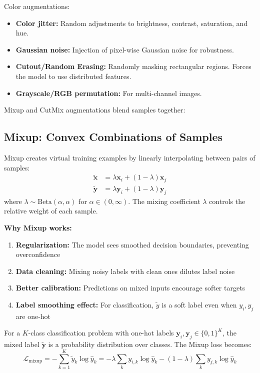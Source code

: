 Color augmentations:
\begin{itemize}
    \item \textbf{Color jitter:} Random adjustments to brightness, contrast, saturation, and hue.
    \item \textbf{Gaussian noise:} Injection of pixel-wise Gaussian noise for robustness.
    \item \textbf{Cutout/Random Erasing:} Randomly masking rectangular regions. Forces the model to use distributed features.
    \item \textbf{Grayscale/RGB permutation:} For multi-channel images.
\end{itemize}

Mixup and CutMix augmentations blend samples together:

\subsection{Mixup: Convex Combinations of Samples}

Mixup \cite{zhang2018mixup} creates virtual training examples by linearly interpolating between pairs of samples:
\begin{align}
\tilde{\mathbf{x}} &= \lambda \mathbf{x}_i + (1 - \lambda)\mathbf{x}_j \\
\tilde{\mathbf{y}} &= \lambda \mathbf{y}_i + (1 - \lambda)\mathbf{y}_j
\end{align}
where $\lambda \sim \text{Beta}(\alpha, \alpha)$ for $\alpha \in (0, \infty)$. The mixing coefficient $\lambda$ controls the relative weight of each sample.

\textbf{Why Mixup works:}
\begin{enumerate}
    \item \textbf{Regularization:} The model sees smoothed decision boundaries, preventing overconfidence
    \item \textbf{Data cleaning:} Mixing noisy labels with clean ones dilutes label noise
    \item \textbf{Better calibration:} Predictions on mixed inputs encourage softer targets
    \item \textbf{Label smoothing effect:} For classification, $\tilde{y}$ is a soft label even when $y_i, y_j$ are one-hot
\end{enumerate}

For a $K$-class classification problem with one-hot labels $\mathbf{y}_i, \mathbf{y}_j \in \{0,1\}^K$, the mixed label $\tilde{\mathbf{y}}$ is a probability distribution over classes. The Mixup loss becomes:
\begin{equation}
\mathcal{L}_{\text{mixup}} = -\sum_{k=1}^{K} \tilde{y}_k \log \hat{y}_k = -\lambda \sum_k y_{i,k} \log \hat{y}_k - (1-\lambda) \sum_k y_{j,k} \log \hat{y}_k
\end{equation}

